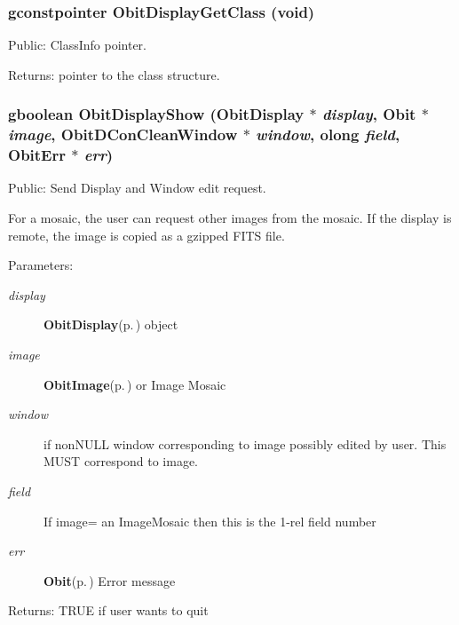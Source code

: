 \subsubsection{\setlength{\rightskip}{0pt plus 5cm}gconstpointer Obit\-Display\-Get\-Class (void)}\label{ObitDisplay_8h_a16}


Public: Class\-Info pointer. 

\begin{Desc}
\item[Returns:]pointer to the class structure. \end{Desc}
\subsubsection{\setlength{\rightskip}{0pt plus 5cm}gboolean Obit\-Display\-Show ({\bf Obit\-Display} $\ast$ {\em display}, {\bf Obit} $\ast$ {\em image}, {\bf Obit\-DCon\-Clean\-Window} $\ast$ {\em window}, {\bf olong} {\em field}, {\bf Obit\-Err} $\ast$ {\em err})}\label{ObitDisplay_8h_a17}


Public: Send Display and Window edit request. 

For a mosaic, the user can request other images from the mosaic. If the display is remote, the image is copied as a gzipped FITS file. \begin{Desc}
\item[Parameters:]
\begin{description}
\item[{\em display}]{\bf Obit\-Display}{\rm (p.\,\pageref{structObitDisplay})} object \item[{\em image}]{\bf Obit\-Image}{\rm (p.\,\pageref{structObitImage})} or Image Mosaic \item[{\em window}]if non\-NULL window corresponding to image possibly edited by user. This MUST correspond to image. \item[{\em field}]If image= an Image\-Mosaic then this is the 1-rel field number \item[{\em err}]{\bf Obit}{\rm (p.\,\pageref{structObit})} Error message \end{description}
\end{Desc}
\begin{Desc}
\item[Returns:]TRUE if user wants to quit \end{Desc}

